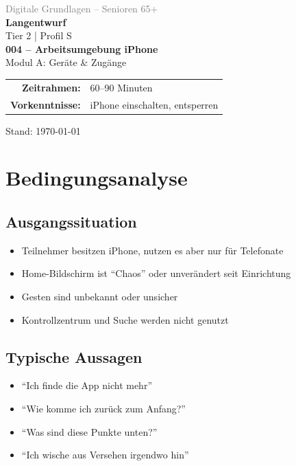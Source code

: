 \documentclass[11pt,a4paper]{article}
\begin{document}
\begin{titlepage}
    \centering
    \vspace*{2cm}
    {\Large\textcolor{gray}{Digitale Grundlagen -- Senioren 65+}}\\[2cm]
    {\Huge\textcolor{fach}{\textbf{Langentwurf}}}\\[0.5cm]
    {\large Tier 2 | Profil S}\\[2cm]
    {\LARGE\textbf{004 -- Arbeitsumgebung iPhone}}\\[0.5cm]
    {\large Modul A: Geräte \& Zugänge}\\[2cm]
    \begin{tabular}{rl}
        \textbf{Zeitrahmen:} & 60--90 Minuten \\
        \textbf{Vorkenntnisse:} & iPhone einschalten, entsperren \\
    \end{tabular}
    \vfill
    {\normalsize Stand: \today}
\end{titlepage}

\tableofcontents
\newpage

\section{Bedingungsanalyse}

\subsection{Ausgangssituation}
\begin{itemize}
    \item Teilnehmer besitzen iPhone, nutzen es aber nur für Telefonate
    \item Home-Bildschirm ist ``Chaos'' oder unverändert seit Einrichtung
    \item Gesten sind unbekannt oder unsicher
    \item Kontrollzentrum und Suche werden nicht genutzt
\end{itemize}

\subsection{Typische Aussagen}
\begin{itemize}
    \item ``Ich finde die App nicht mehr''
    \item ``Wie komme ich zurück zum Anfang?''
    \item ``Was sind diese Punkte unten?''
    \item ``Ich wische aus Versehen irgendwo hin''
\end{itemize}
\end{document}
